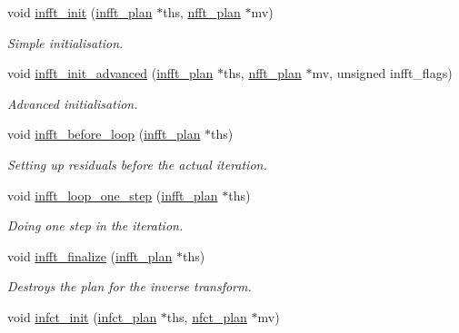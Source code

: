 \begin{CompactItemize}
\item 
\hypertarget{group__solver_ga0}{
void \hyperlink{group__solver_ga0}{infft\_\-init} (\hyperlink{structinfft__plan}{infft\_\-plan} $\ast$ths, \hyperlink{structnfft__plan}{nfft\_\-plan} $\ast$mv)}
\label{group__solver_ga0}

\begin{CompactList}\small\item\em Simple initialisation. \item\end{CompactList}\item 
\hypertarget{group__solver_ga1}{
void \hyperlink{group__solver_ga1}{infft\_\-init\_\-advanced} (\hyperlink{structinfft__plan}{infft\_\-plan} $\ast$ths, \hyperlink{structnfft__plan}{nfft\_\-plan} $\ast$mv, unsigned infft\_\-flags)}
\label{group__solver_ga1}

\begin{CompactList}\small\item\em Advanced initialisation. \item\end{CompactList}\item 
\hypertarget{group__solver_ga2}{
void \hyperlink{group__solver_ga2}{infft\_\-before\_\-loop} (\hyperlink{structinfft__plan}{infft\_\-plan} $\ast$ths)}
\label{group__solver_ga2}

\begin{CompactList}\small\item\em Setting up residuals before the actual iteration. \item\end{CompactList}\item 
\hypertarget{group__solver_ga3}{
void \hyperlink{group__solver_ga3}{infft\_\-loop\_\-one\_\-step} (\hyperlink{structinfft__plan}{infft\_\-plan} $\ast$ths)}
\label{group__solver_ga3}

\begin{CompactList}\small\item\em Doing one step in the iteration. \item\end{CompactList}\item 
\hypertarget{group__solver_ga4}{
void \hyperlink{group__solver_ga4}{infft\_\-finalize} (\hyperlink{structinfft__plan}{infft\_\-plan} $\ast$ths)}
\label{group__solver_ga4}

\begin{CompactList}\small\item\em Destroys the plan for the inverse transform. \item\end{CompactList}\item 
\hypertarget{group__solver_ga5}{
void \hyperlink{group__solver_ga5}{infct\_\-init} (\hyperlink{structinfct__plan}{infct\_\-plan} $\ast$ths, \hyperlink{structnfct__plan}{nfct\_\-plan} $\ast$mv)}
\label{group__solver_ga5}


\end{CompactItemize}
